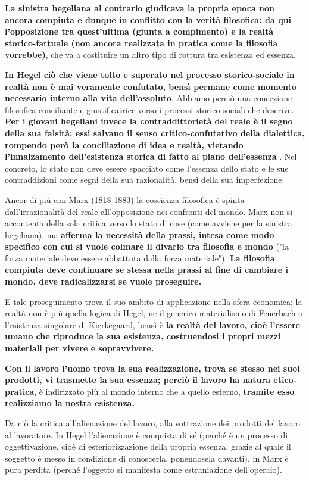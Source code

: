  \textbf{La sinistra hegeliana al contrario giudicava la propria epoca non ancora compiuta e dunque in conflitto con la verità filosofica: da qui l'opposizione tra quest'ultima (giunta a compimento) e la realtà storico-fattuale (non ancora realizzata in pratica come la filosofia vorrebbe)}, che va a costituire un altro tipo di rottura tra esistenza ed essenza.
 
 \textbf{In Hegel ciò che viene tolto e superato nel processo storico-sociale in realtà non è mai veramente confutato, bensì permane come momento necessario interno alla vita dell'assoluto}. Abbiamo perciò una concezione filosofica conciliante e giustificatrice verso i processi storico-sociali che descrive. \textbf{Per i giovani hegeliani invece la contraddittorietà del reale è il segno della sua falsità: essi salvano il senso critico-confutativo della dialettica, rompendo però la conciliazione di idea e realtà, vietando l'innalzamento dell'esistenza storica di fatto al piano dell'essenza }. Nel concreto, lo stato non deve essere spacciato come l'essenza dello stato e le sue contraddizioni come segni della sua razionalità, bensì della sua imperfezione.
 
 Ancor di più con Marx (1818-1883) la coscienza filosofica è spinta dall'irrazionalità del reale all'opposizione nei confronti del mondo. Marx non si accontenta della sola critica verso lo stato di cose (come avviene per la sinistra hegeliana), ma \textbf{afferma la necessità della prassi, intesa come modo specifico con cui si vuole colmare il divario tra filosofia e mondo} ("la forza materiale deve essere abbattuta dalla forza materiale"). \textbf{La filosofia compiuta deve continuare se stessa nella prassi al fine di cambiare i mondo, deve radicalizzarsi se vuole proseguire.}
 
 E tale proseguimento trova il suo ambito di applicazione nella sfera economica; la realtà non è più quella logica di Hegel, ne il generico materialismo di Feuerbach o l'esistenza singolare di Kierkegaard, bensì è \textbf{la realtà del lavoro, cioè l'essere umano che riproduce la sua esistenza, costruendosi i propri mezzi materiali per vivere e sopravvivere.}
 
 \textbf{Con il lavoro l'uomo trova la sua realizzazione, trova se stesso nei suoi prodotti, vi trasmette la sua essenza; perciò il lavoro ha natura etico-pratica}, è indirizzato più al mondo interno che a quello esterno, \textbf{tramite esso realizziamo la nostra esistenza.}
 
 Da ciò la critica all'alienazione del lavoro, alla sottrazione dei prodotti del lavoro al lavoratore. In Hegel l'alienazione è conquista di sé (perché è un processo di oggettivazione, cioè di esteriorizzazione della propria essenza, grazie al quale il soggetto è messo in condizione di conoscerla, ponendosela davanti), in Marx è pura perdita (perché l'oggetto si manifesta come estraniazione dell'operaio).
 
